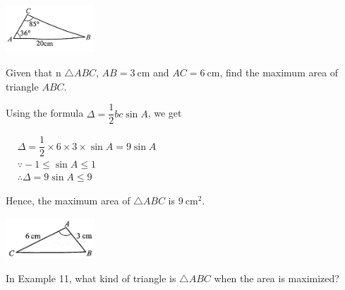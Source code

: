 \documentclass{report}
\begin{document}
\begin{question}
\begin{enumerate}[label=(\alph*)]
{\begin{vwcol}[widths={0.7,0.3}, sep=8mm, rule=0pt]
                    \vspace{3em}
                    \parbox{0.25\textwidth}{
                    \vspace{3em}
                    \includegraphics[width=0.25\textwidth]{assets/10-39.jpg}}
                \end{vwcol}
            }
            \vspace{-5em}
        \end{enumerate}
    \end{question}

    \begin{question}
        Given that n $\triangle ABC$, $AB = 3 \mathrm{~cm}$ and $AC = 6 \mathrm{~cm}$, find the maximum area of triangle $ABC$.

        \sol{}
        \begin{vwcol}[widths={0.6,0.4}, sep=8mm, rule=0pt,justify=flushleft]
            \noindent Using the formula $\Delta = \dfrac{1}{2}bc\sin A$, we get 
        
            \noindent $\begin{aligned} & \Delta=\dfrac{1}{2} \times 6 \times 3 \times \sin A=9 \sin A \\ & \because-1 \leq \sin A \leq 1 \\ & \therefore \Delta=9 \sin A \leq 9\end{aligned}$

            \noindent Hence, the maximum area of $\triangle ABC$ is $9 \mathrm{~cm}^{2}$.
            \vspace{3em}

            \includegraphics[width=0.25\textwidth]{assets/10-40.jpg}
        \end{vwcol}
        \vspace{-1em}    
    \end{question}

    \vspace{-1em}    
    \begin{think}
        
        \noindent In Example 11, what kind of triangle is $\triangle ABC$ when the area is maximized?
    \end{think}
\end{document}
